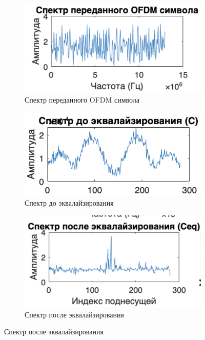 \documentclass[a4paper,14pt,oneside,openany]{memoir}
\begin{document}
	\begin{figure}[ht]
		\centering
		\begin{subfigure}{0.45\textwidth}
			\centering
			\includegraphics{ofdm_spectrum_tx.png}
			\caption{Спектр переданного OFDM символа}
			\label{fig:signal_analysis:a}
		\end{subfigure}
		\hfill
		\begin{subfigure}{0.45\textwidth}
			\centering
			\includegraphics{spectrum_before_eq.png}
			\caption{Спектр до эквалайзирования}
			\label{fig:signal_analysis:b}
		\end{subfigure}
		\hfill
		\begin{subfigure}{0.45\textwidth}
			\centering
			\includegraphics{spectrum_after_eq.png}
			\caption{Спектр после эквалайзирования}

\end{subfigure}
\end{figure}
\end{document}
